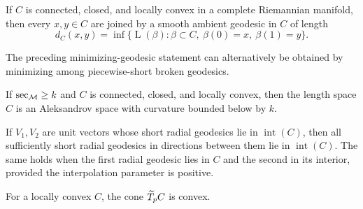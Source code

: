 \begin{lemma}
\label{lem:chow-iii-h15-minimal-geodesics-locally-convex}
If $C$ is connected, closed, and locally convex in a complete Riemannian manifold,
then every $x,y\in C$ are joined by a smooth ambient geodesic in $C$ of length
\[
d_C(x,y)=\inf\{\operatorname{L}(\beta):\beta\subset C,\ \beta(0)=x,\ \beta(1)=y\}.
\]
\end{lemma}

\begin{remark}
\label{rem:chow-iii-h16-locally-convex-length-space}
The preceding minimizing-geodesic statement can alternatively be obtained by
minimizing among piecewise-short broken geodesics.
\end{remark}

\begin{proposition}
\label{prop:chow-iii-h17-aleksandrov-subset}
If $\sec_{\M}\ge k$ and $C$ is connected, closed, and locally convex, then the
length space $C$ is an Aleksandrov space with curvature bounded below by $k$.
\end{proposition}

\begin{lemma}
\label{lem:chow-iii-h18-infinitesimal-convexity}
If $V_1,V_2$ are unit vectors whose short radial geodesics lie in $\operatorname{int}(C)$,
then all sufficiently short radial geodesics in directions between them lie in
$\operatorname{int}(C)$.  The same holds when the first radial geodesic lies in $C$
and the second in its interior, provided the interpolation parameter is positive.
\end{lemma}

\begin{corollary}
\label{cor:chow-iii-h19-interior-tangent-cone-convex}
For a locally convex $C$, the cone $\widetilde T_pC$ is convex.
\end{corollary}

